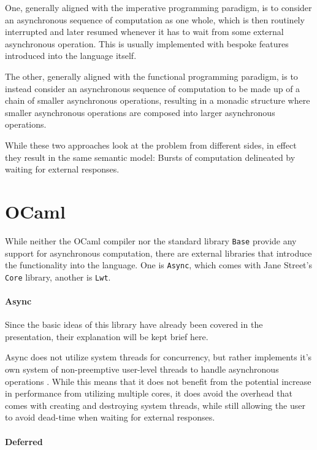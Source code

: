 \documentclass[a4paper,UKenglish,cleveref, autoref, thm-restate]{lipics-v2021}
\begin{document}
One, generally aligned with the imperative programming paradigm, is to consider an asynchronous sequence of computation as one whole, which is then routinely interrupted and later resumed whenever it has to wait from some external asynchronous operation. This is usually implemented with bespoke features introduced into the language itself.

The other, generally aligned with the functional programming paradigm, is to instead consider an asynchronous sequence of computation to be made up of a chain of smaller asynchronous operations, resulting in a monadic structure where smaller asynchronous operations are composed into larger asynchronous operations.

While these two approaches look at the problem from different sides, in effect they result in the same semantic model: Bursts of computation delineated by waiting for external responses.

\section{OCaml}
\label{sec:ocaml}

While neither the OCaml compiler nor the standard library \lstinline{Base} provide any support for asynchronous computation, there are external libraries that introduce the functionality into the language. One is \lstinline{Async}, which comes with Jane Street's \lstinline{Core} library, another is \lstinline{Lwt}.

\paragraph*{Async}

Since the basic ideas of this library have already been covered in the presentation, their explanation will be kept brief here.

Async does not utilize system threads for concurrency, but rather implements it's own system of non-preemptive user-level threads to handle asynchronous operations \cite{Concurre6:online}. While this means that it does not benefit from the potential increase in performance from utilizing multiple cores, it does avoid the overhead that comes with creating and destroying system threads, while still allowing the user to avoid dead-time when waiting for external responses.

\paragraph*{Deferred}
\end{document}
